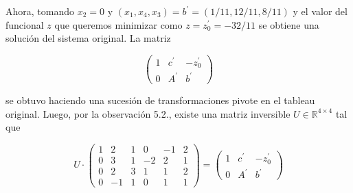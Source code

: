 \documentclass[10pt]{article}
\begin{document}
Ahora, tomando $x_{2}=0$ y $\left(x_{1}, x_{4}, x_{3}\right)=b^{\prime}=(1 / 11,12 / 11,8 / 11)$ y el valor del funcional $z$ que queremos minimizar como $z=z_{0}^{\prime}=-32 / 11$ se obtiene una solución del sistema original. La matriz

$$
\left(\begin{array}{cc|c}
1 & c^{\prime} & -z_{0}^{\prime} \\
0 & A^{\prime} & b^{\prime}
\end{array}\right)
$$

se obtuvo haciendo una sucesión de transformaciones pivote en el tableau original. Luego, por la observación 5.2., existe una matriz inversible $U \in \mathbb{R}^{4 \times 4}$ tal que

$$
U \cdot\left(\begin{array}{ccccc|c}
1 & 2 & 1 & 0 & -1 & 2 \\
0 & 3 & 1 & -2 & 2 & 1 \\
0 & 2 & 3 & 1 & 1 & 2 \\
0 & -1 & 1 & 0 & 1 & 1
\end{array}\right)=\left(\begin{array}{cccc}
1 & c^{\prime} & -z_{0}^{\prime} \\
0 & A^{\prime} & b^{\prime}
\end{array}\right)
$$
\end{document}
